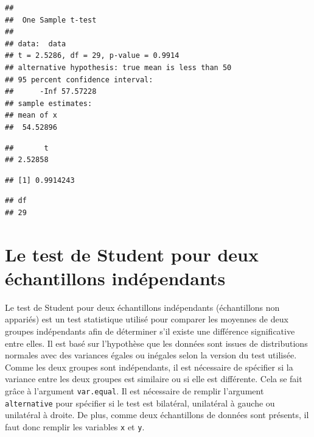 \documentclass[
]{book}
\newenvironment{Shaded}{\begin{snugshade}}{\end{snugshade}}
\newcommand{\NormalTok}[1]{#1}
\newcommand{\SpecialCharTok}[1]{\textcolor[rgb]{0.81,0.36,0.00}{\textbf{#1}}}
\begin{document}
\begin{verbatim}
## 
##  One Sample t-test
## 
## data:  data
## t = 2.5286, df = 29, p-value = 0.9914
## alternative hypothesis: true mean is less than 50
## 95 percent confidence interval:
##      -Inf 57.57228
## sample estimates:
## mean of x 
##  54.52896
\end{verbatim}

\begin{Shaded}
\end{Shaded}

\begin{verbatim}
##       t 
## 2.52858
\end{verbatim}

\begin{Shaded}
\end{Shaded}

\begin{verbatim}
## [1] 0.9914243
\end{verbatim}

\begin{Shaded}
\end{Shaded}

\begin{verbatim}
## df 
## 29
\end{verbatim}

\section{Le test de Student pour deux échantillons indépendants}\label{le-test-de-student-pour-deux-uxe9chantillons-induxe9pendants}

Le test de Student pour deux échantillons indépendants (échantillons non appariés) est un test statistique utilisé pour comparer les moyennes de deux groupes indépendants afin de déterminer s'il existe une différence significative entre elles. Il est basé sur l'hypothèse que les données sont issues de distributions normales avec des variances égales ou inégales selon la version du test utilisée. Comme les deux groupes sont indépendants, il est nécessaire de spécifier si la variance entre les deux groupes est similaire ou si elle est différente. Cela se fait grâce à l'argument \texttt{var.equal}. Il est nécessaire de remplir l'argument \texttt{alternative} pour spécifier si le test est bilatéral, unilatéral à gauche ou unilatéral à droite. De plus, comme deux échantillons de données sont présents, il faut donc remplir les variables \texttt{x} et \texttt{y}.
\end{document}
